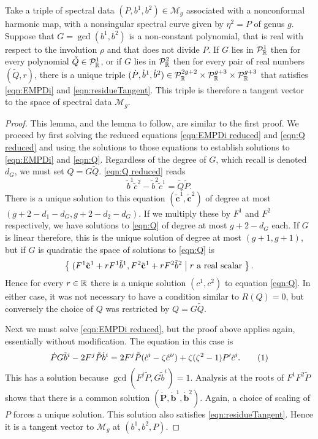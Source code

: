 \documentclass{article}
\begin{document}
\begin{lem}[Case (ii)]
    \label{lem:tangent G}
Take a triple of spectral data $(P,b^1,b^2)\in\mathcal{M}_g$ associated with a nonconformal harmonic map, with a nonsingular spectral curve given by $\eta^2 = P$ of genus $g$. Suppose that $G = \gcd(b^1,b^2)$ is a non-constant polynomial, that is real with respect to the involution $\rho$ and that does not divide $P$. If $G$ lies in $\mathcal{P}^1_{\mathbb{R}}$ then for every polynomial $\tilde{Q}\in\mathcal{P}^1_{\mathbb{R}}$, or if $G$ lies in $\mathcal{P}^2_{\mathbb{R}}$ then for every pair of real numbers $(\tilde{Q},r)$, there is a unique triple $(\dot P, \dot b^1, \dot b^2) \in \mathcal{P}_{\mathbb{R}}^{2g+2}\times\mathcal{P}_{\mathbb{R}}^{g+3}\times\mathcal{P}_{\mathbb{R}}^{g+3}$ that satisfies \eqref{eqn:EMPDi} and \eqref{eqn:residueTangent}. This triple is therefore a tangent vector to the space of spectral data $\mathcal{M}_g$.

\begin{proof}
This lemma, and the lemma to follow, are similar to the first proof. We proceed by first solving the reduced equations \eqref{eqn:EMPDi reduced} and \eqref{eqn:Q reduced} and using the solutions to those equations to establish solutions to \eqref{eqn:EMPDi} and \eqref{eqn:Q}. Regardless of the degree of $G$, which recall is denoted $d_G$, we must set $Q = G\tilde{Q}$. \eqref{eqn:Q reduced} reads
\[
\tilde{b}^1\tilde{c}^2 - \tilde{b}^2\tilde{c}^1 = \tilde{Q}\tilde{P}.
\]
There is a unique solution to this equation $(\mathbf{\tilde{c}}^1,\mathbf{\tilde{c}}^2)$ of degree at most $(g+2-d_1-d_G,g+2-d_2-d_G)$. If we multiply these by $F^1$ and $F^2$ respectively, we have solutions to \eqref{eqn:Q} of degree at most $g+2-d_G$ each. If $G$ is linear therefore, this is the unique solution of degree at most $(g+1,g+1)$, but if $G$ is quadratic the space of solutions to \eqref{eqn:Q} is
\[
\left\{\;  (F^1\mathbf{\tilde{c}}^1 + rF^1\tilde{b}^1, F^2\mathbf{\tilde{c}}^1 + rF^2\tilde{b}^2  \;\middle|\;  r \text{ a real scalar}  \;\right\}.
\]
Hence for every $r\in\mathbb{R}$ there is a unique solution $(c^1, c^2)$ to equation \eqref{eqn:Q}. In either case, it was not necessary to have a condition similar to $R(Q)=0$, but conversely the choice of $Q$ was restricted by $Q = G\tilde{Q}$.

Next we must solve \eqref{eqn:EMPDi reduced}, but the proof above applies again, essentially without modification. The equation in this case is
\[
\dot{P} G \tilde{b}^i - 2 F^j \tilde{P} \dot{b}^i = 2 F^j \tilde{P} (\hat{c}^i - \zeta\hat{c}^{i\prime}) + \zeta(\zeta^2-1)P' \tilde{c}^i.
\labelthis{eqn:EMPDi nc G}
\]
This has a solution because $\gcd(F^j\tilde{P},G\tilde{b}^i) = 1$. Analysis at the roots of $F^1F^2\tilde{P}$ shows that there is a common solution $(\mathbf{\dot{P}}, \mathbf{\dot{b}}^1, \mathbf{\dot{b}}^2)$. Again, a choice of scaling of $P$ forces a unique solution. This solution also satisfies \eqref{eqn:residueTangent}. Hence it is a tangent vector to $\mathcal{M}_g$ at $(b^1,b^2,P)$.
\end{proof}
\end{lem}
\end{document}
